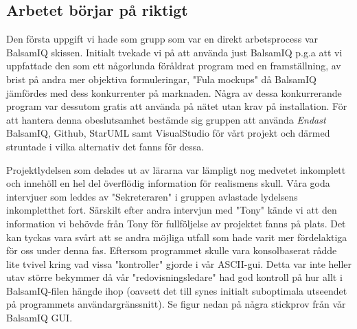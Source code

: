 \documentclass{article}
\theoremstyle{remark}                                         %
\begin{document}
\subsection{Arbetet börjar på riktigt}
Den första uppgift vi hade som grupp som var en direkt arbetsprocess var BalsamIQ skissen. Initialt tvekade vi på att använda just BalsamIQ p.g.a att vi uppfattade den som ett någorlunda föråldrat program med en framställning, av brist på andra mer objektiva formuleringar, "Fula mockups" då BalsamIQ jämfördes med dess konkurrenter på marknaden. Några av dessa konkurrerande program var dessutom gratis att använda på nätet utan krav på installation.
För att hantera denna obeslutsamhet bestämde sig gruppen att använda \emph{Endast} BalsamIQ,  Github, StarUML samt VisualStudio för vårt projekt och därmed struntade i vilka alternativ det fanns för dessa.

Projektlydelsen som delades ut av lärarna var lämpligt nog medvetet inkomplett och innehöll en hel del överflödig information för realismens skull. Våra goda intervjuer som leddes av "Sekreteraren" i gruppen avlastade lydelsens inkompletthet fort. Särskilt efter andra intervjun med "Tony" kände vi att den information vi behövde från Tony för fullföljelse av projektet fanns på plats. Det kan tyckas vara svårt att se andra möjliga utfall som hade varit mer fördelaktiga för oss under denna fas. Eftersom programmet skulle vara konsolbaserat rådde lite tvivel kring vad vissa "kontroller" gjorde i vår ASCII-gui. Detta var inte heller utav större bekymmer då vår "redovisningsledare" had god kontroll på hur allt i BalsamIQ-filen hängde ihop (oavsett det till synes initialt suboptimala utseendet på programmets användargränssnitt). Se figur nedan på några stickprov från vår BalsamIQ GUI.
\end{document}
